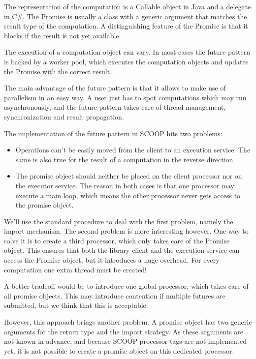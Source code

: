 \documentclass[a4paper,10pt]{report}
\begin{document}
The representation of the computation is a Callable object in Java and a delegate in C\#.
The Promise is usually a class with a generic argument that matches the result type of the computation.
A distinguishing feature of the Promise is that it blocks if the result is not yet available.

The execution of a computation object can vary.
In most cases the future pattern is backed by a worker pool, which executes the computation objects and updates the Promise with the correct result.

The main advantage of the future pattern is that it allows to make use of parallelism in an easy way.
A user just has to spot computations which may run asynchronously, and the future pattern takes care of thread management, synchronization and result propagation.

The implementation of the future pattern in SCOOP hits two problems:
\begin{itemize}
 \item Operations can't be easily moved from the client to an execution service.
 The same is also true for the result of a computation in the reverse direction.
 \item The promise object should neither be placed on the client processor nor on the executor service.
 The reason in both cases is that one processor may execute a main loop, which means the other processor never gets access to the promise object.
\end{itemize}

We'll use the standard procedure to deal with the first problem, namely the import mechanism.
The second problem is more interesting however.
One way to solve it is to create a third processor, which only takes care of the Promise object.
This ensures that both the library client and the execution service can access the Promise object, but it introduces a huge overhead.
For every computation one extra thread must be created!

A better tradeoff would be to introduce one global processor, which takes care of all promise objects.
This may introduce contention if multiple futures are submitted, but we think that this is acceptable.

However, this approach brings another problem.
A promise object has two generic arguments for the return type and the import strategy.
As these arguments are not known in advance, and because SCOOP processor tags  are not implemented yet, it is not possible to create a promise object on this dedicated processor.
\end{document}
